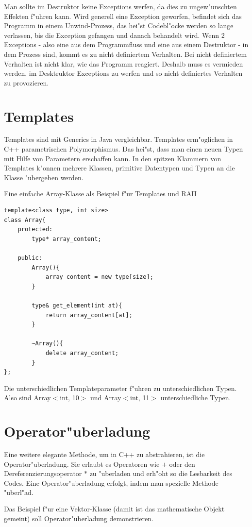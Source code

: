 \documentclass[14pt, a4paper]{report}
\begin{document}
Man sollte im Destruktor keine Exceptions werfen, da dies zu ungew"unschten Effekten 
f"uhren kann. Wird generell eine Exception geworfen, befindet sich das Programm in einem
Unwind-Prozess, das hei"st Codebl"ocke werden so lange verlassen, bis die Exception
gefangen und danach behandelt wird. Wenn 2 Exceptions - also eine aus
dem Programmfluss und eine aus einem Destruktor - in dem Prozess sind, kommt es zu nicht
definiertem Verhalten. Bei nicht definiertem Verhalten ist nicht klar, wie das Programm 
reagiert. Deshalb muss es vermieden werden, im Desktruktor Exceptions zu werfen und so
nicht definiertes Verhalten zu provozieren.
\newpage
\section{Templates}
Templates sind mit Generics in Java vergleichbar. Templates erm"oglichen in C++
parametrischen Polymorphismus. Das hei"st, dass man einen neuen Typen mit Hilfe von 
Parametern erschaffen kann. In den spitzen Klammern von Templates k"onnen mehrere 
Klassen, primitive Datentypen und Typen an die Klasse "ubergeben werden.

Eine einfache Array-Klasse als Beispiel f"ur Templates und RAII
\begin{lstlisting}
template<class type, int size>
class Array{
	protected:
		type* array_content;

	public:
		Array(){
			array_content = new type[size];
		}

		type& get_element(int at){
			return array_content[at];
		}

		~Array(){
			delete array_content;
		}
}; 
\end{lstlisting}

Die unterschiedlichen Templateparameter f"uhren zu unterschiedlichen Typen. Also sind 
Array$<$int, 10$>$ und Array$<$int, 11$>$ unterschiedliche Typen.

\newpage
\section{Operator"uberladung}
Eine weitere elegante Methode, um in C++ zu abstrahieren, ist die Operator"uberladung.
Sie erlaubt es Operatoren wie $+$ oder den Dereferenzierungsoperator $*$ zu "uberladen
und erh"oht so die Lesbarkeit des Codes. Eine Operator"uberladung erfolgt, indem man
spezielle Methode "uberl"ad.

Das Beispiel f"ur eine Vektor-Klasse (damit ist das mathematische Objekt gemeint) soll
Operator"uberladung demonstrieren.
\end{document}
